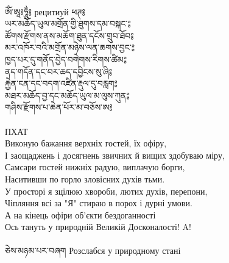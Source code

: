 \\
\ti
ཨོཾ་ཨཱཿཧཱུྂ༔
\ru рецитиуй
\newpage
\ti
ཕཊ༔\\
ཡར་མཆོད་ཡུལ་མགྲོན་གྱི་ཐུགས་དམ་བསྐང་༔\\
ཚོགས་རྫོགས་ནས་མཆོག་ཐུན་དངོས་གྲུབ་ཐོབ༔\\
མར་འཁོར་བའི་མགྲོན་མཉེས་ལན་ཆགས་བྱང་༔\\
ཁྱད་པར་དུ་གནོད་བྱེད་བགེགས་རིགས་ཚིམ༔\\
ནད་གདོན་དང་བར་ཆད་དབྱིངས་སུ་ཞི༔\\
རྐྱེན་ངན་དང་བདག་འཛིན་རྡུལ་དུ་བརླག༔\\
མཐར་མཆོད་བྱ་དང་མཆོད་ཡུལ་མ་ལུས་ཀུན༔\\
གཤིས་རྫོགས་པ་ཆེན་པོར་མ་བཅོས་ཨ༔\\
\\
\ru
ПХАТ\\
Виконую бажання верхніх гостей, їх офіру,\\
І заощаджень і досягнень звичних й вищих здобуваю міру,\\
Самсари гостей нижніх радую, виплачую борги,\\
Наситивши по горло зловісних духів тьми.\\
У просторі я зцілюю хвороби, лютих духів, перепони,\\
Чіпляння всі за "Я" стираю в порох і дурні умови.\\
А на кінець офіри об'єкти бездоганності\\
Ось тануть у природній Великій Досконалості! A!\\
\\
\ti
ཅེས་མཉམ་པར་བཞག \ru Розслабся у природному стані